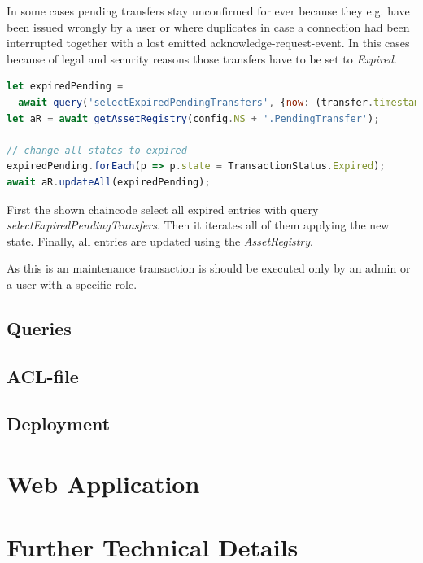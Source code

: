 In some cases pending transfers stay unconfirmed for ever because they e.g. have been issued wrongly by a user or where duplicates in case a connection had been interrupted together with a lost emitted acknowledge-request-event. In this cases because of legal and security reasons those transfers have to be set to \textit{Expired}.

\begin{center}
\begin{minipage}{0.8\textwidth}
\small
\begin{lstlisting}[language=javascript,firstnumber=1,caption={\bf\small clearDebt JavaScript excerpt}, captionpos=b,label=lst:js-cleanupPending]
let expiredPending =
  await query('selectExpiredPendingTransfers', {now: (transfer.timestamp)});
let aR = await getAssetRegistry(config.NS + '.PendingTransfer');

// change all states to expired
expiredPending.forEach(p => p.state = TransactionStatus.Expired);
await aR.updateAll(expiredPending);
\end{lstlisting}
\end{minipage}
\end{center}

First the shown chaincode select all expired entries with query \textit{selectExpiredPendingTransfers}. Then it iterates all of them applying the new state. Finally, all entries are updated using the \textit{AssetRegistry}.

As this is an maintenance transaction is should be executed only by an admin or a user with a specific role.

\subsection{Queries}
\label{subsec:queries}

\todo{}

\subsection{ACL-file}

\todo{}

\subsection{Deployment}

\todo{}


\section{Web Application}
\label{sec:webapp}


\section{Further Technical Details}
\label{sec:technical-details}

